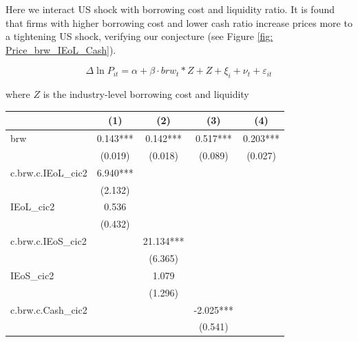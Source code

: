 \documentclass[12pt]{article}
\begin{document}
Here we interact US shock with borrowing cost and liquidity ratio. It is found that firms with higher borrowing cost and lower cash ratio increase prices more to a tightening US shock, verifying our conjecture (see Figure \ref{fig: Price_brw_IEoL_Cash}). 

$$
\Delta \ln P_{it} = \alpha +\beta \cdot brw_{t}*Z+Z+\xi_{i}+\nu_{t}+\varepsilon_{i t} 
$$

where $Z$ is the industry-level borrowing cost and liquidity

\begin{center}
\begin{tabular}{l*{4}{c}}
\toprule
            &\multicolumn{1}{c}{(1)}         &\multicolumn{1}{c}{(2)}         &\multicolumn{1}{c}{(3)}         &\multicolumn{1}{c}{(4)}         \\
\midrule
brw         &       0.143***&       0.142***&       0.517***&       0.203***\\
            &     (0.019)         &     (0.018)         &     (0.089)         &     (0.027)         \\
\addlinespace
c.brw.c.IEoL\_cic2&       6.940***&                     &                     &                     \\
            &     (2.132)         &                     &                     &                     \\
\addlinespace
IEoL\_cic2   &       0.536         &                     &                     &                     \\
            &     (0.432)         &                     &                     &                     \\
\addlinespace
c.brw.c.IEoS\_cic2&                     &      21.134***&                     &                     \\
            &                     &     (6.365)         &                     &                     \\
\addlinespace
IEoS\_cic2   &                     &       1.079         &                     &                     \\
            &                     &     (1.296)         &                     &                     \\
\addlinespace
c.brw.c.Cash\_cic2&                     &                     &      -2.025***&                     \\
            &                     &                     &     (0.541)         &                     \\

\end{tabular}
\end{center}
\end{document}
